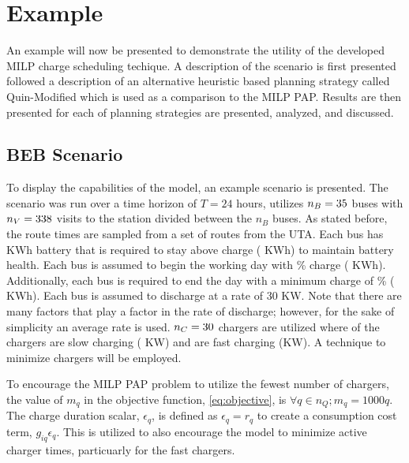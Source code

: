 
%
\section{Example}
\label{sec:example}

An example will now be presented to demonstrate the utility of the developed MILP charge scheduling techique. A
description of the scenario is first presented followed a description of an alternative heuristic based planning
strategy called Quin-Modified which is used as a comparison to the MILP PAP. Results are then presented for each of
planning strategies are presented, analyzed, and discussed.

%
\subsection{BEB Scenario}

To display the capabilities of the model, an example scenario is presented. The scenario was run over a time horizon of
$T=24$ hours, utilizes $n_B = 35$ buses with $n_V = 338$ visits to the station divided between the $n_B$ buses. 
As stated before, the route times are sampled from a set of routes from the UTA.
Each bus has 
\batsize KWh battery that is required to stay above \mincharge charge (\fpeval{\batsize * \minchargeD} KWh) to
maintain battery health. Each bus is assumed to begin the working day with \% charge
(\fpeval{\acharge * \batsize} KWh). Additionally, each bus is required to end the day with a minimum charge of
\% (\fpeval{\bcharge * \batsize} KWh). Each bus is assumed to discharge at a rate of 30 KW. Note
that there are many factors that play a factor in the rate of discharge; however, for the sake of simplicity an average
rate is used. $n_C = \fpeval{\fast + \slow}$ chargers are utilized where \slow of the chargers are slow charging (\slows
KW) and \fast are fast charging (\fasts KW). A technique to minimize chargers will be employed.

To encourage the MILP PAP problem to utilize the fewest number of chargers, the value of $m_q$ in the objective
function, \eqref{eq:objective}, is $\forall q \in n_Q; m_q = 1000q$. The charge duration scalar, $\epsilon_q$, is defined as $\epsilon_q = r_q$
to create a consumption cost term, $g_{iq}\epsilon_q$. This is utilized to also encourage the model to minimize active charger
times, particuarly for the fast chargers.

